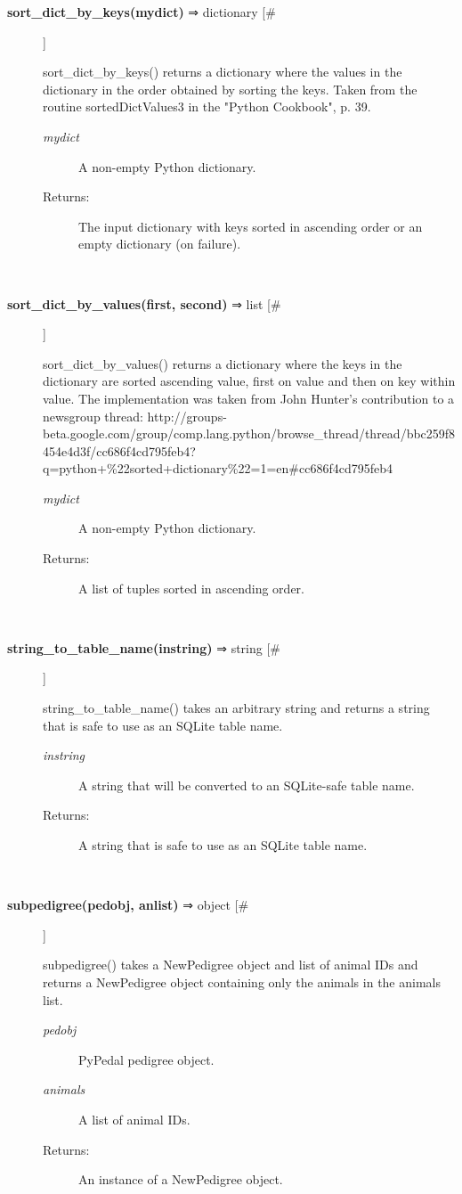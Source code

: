 \begin{description}
\item[\textbf{sort\_dict\_by\_keys(mydict)} ⇒ dictionary [\#]
]
\par sort\_dict\_by\_keys() returns a dictionary where the values in the dictionary
in the order obtained by sorting the keys.  Taken from the routine sortedDictValues3
in the "Python Cookbook", p. 39.
\begin{description}
\item[\textit{mydict}
]
A non-empty Python dictionary.
\item[Returns:
]
The input dictionary with keys sorted in ascending order or an empty dictionary (on failure).
\end{description}\\

\item[\textbf{sort\_dict\_by\_values(first, second)} ⇒ list [\#]
]
\par sort\_dict\_by\_values() returns a dictionary where the keys in the dictionary
are sorted ascending value, first on value and then on key within value.  The
implementation was taken from John Hunter's contribution to a newsgroup thread:
http://groups-beta.google.com/group/comp.lang.python/browse\_thread/thread/bbc259f8454e4d3f/cc686f4cd795feb4?q=python+\%22sorted+dictionary\%22=1=en\#cc686f4cd795feb4
\begin{description}
\item[\textit{mydict}
]
A non-empty Python dictionary.
\item[Returns:
]
A list of tuples sorted in ascending order.
\end{description}\\

\item[\textbf{string\_to\_table\_name(instring)} ⇒ string [\#]
]
\par string\_to\_table\_name() takes an arbitrary string and returns a string that
is safe to use as an SQLite table name.
\begin{description}
\item[\textit{instring}
]
A string that will be converted to an SQLite-safe table name.
\item[Returns:
]
A string that is safe to use as an SQLite table name.
\end{description}\\

\item[\textbf{subpedigree(pedobj, anlist)} ⇒ object [\#]
]
\par subpedigree() takes a NewPedigree object and list of animal
IDs and returns a NewPedigree object containing only the
animals in the animals list.
\begin{description}
\item[\textit{pedobj}
]
PyPedal pedigree object.
\item[\textit{animals}
]
A list of animal IDs.
\item[Returns:
]
An instance of a NewPedigree object.
\end{description}\\


\end{description}
